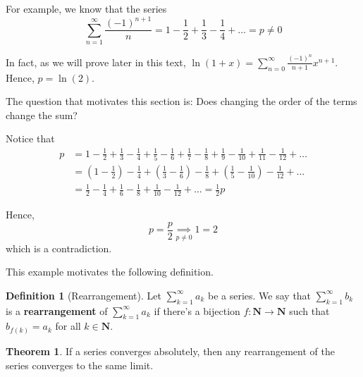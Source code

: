 \documentclass[12pt,a4paper]{article}
\theoremstyle{definition}
\newtheorem{theorem}{Theorem}[section]
\newtheorem{definition}{Definition}[section]
\begin{document}
For example, we know that the series \[ \sum_{n=1}^\infty \frac{(-1)^{n+1}}{n} = 1 - \frac{1}{2} + \frac{1}{3} - \frac{1}{4} + \ldots = p \neq 0 \]

In fact, as we will prove later in this text, $\ln (1+x) = \sum_{n=0}^\infty \frac{(-1)^{n}}{n+1} x^{n+1}$. Hence, $p = \ln (2)$.

The question that motivates this section is: Does changing the order of the terms change the sum?

Notice that
\begin{equation*}
	\begin{aligned}
		p &=  1 - \frac{1}{2} + \frac{1}{3} - \frac{1}{4} + \frac{1}{5} - \frac{1}{6} + \frac{1}{7} - \frac{1}{8} + \frac{1}{9} - \frac{1}{10} + \frac{1}{11} - \frac{1}{12} + \ldots \\
		&= \left( 1 - \frac{1}{2} \right) - \frac{1}{4} + \left( \frac{1}{3} - \frac{1}{6} \right) - \frac{1}{8} + \left( \frac{1}{5} - \frac{1}{10} \right) - \frac{1}{12} + \ldots \\
		&= \frac{1}{2} - \frac{1}{4} + \frac{1}{6} - \frac{1}{8} + \frac{1}{10} - \frac{1}{12} + \ldots = \frac{1}{2} p
	\end{aligned}
\end{equation*}

Hence,
\[
	p = \frac{p}{2} \underset{p \neq 0}{\implies} 1 = 2
\]
which is a contradiction.

This example motivates the following definition.

\begin{definition}[Rearrangement]
	Let $\sum_{k=1}^\infty a_k$ be a series. We say that $\sum_{k=1}^\infty b_k$ is a \textbf{rearrangement} of $\sum_{k=1}^\infty a_k$ if there's a bijection $f: \textbf{N} \longrightarrow \textbf{N}$ such that $b_{f(k)} = a_k$ for all $k \in \textbf{N}$.
\end{definition}

\begin{theorem}
	If a series converges absolutely, then any rearrangement of the series converges to the same limit.
\end{theorem}
\end{document}
